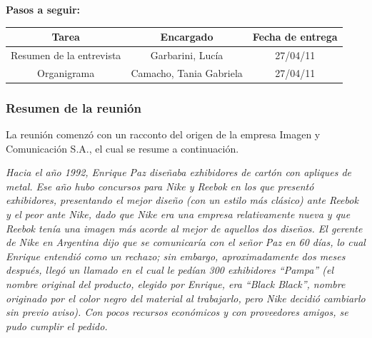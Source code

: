 \documentclass[a4paper,10pt,titlepage]{article}
\begin{document}

%
%

\vspace{8cm}
\textbf{Pasos a seguir:}\\
	    \begin{center}
	    \begin{tabular}{|c|c|c|}
		    \hline \textbf{Tarea} & \textbf{Encargado} & \textbf{Fecha de entrega} \\ 
		    \hline Resumen de la entrevista & Garbarini, Luc\'ia & 27/04/11 \\ 
		    \hline Organigrama & Camacho, Tania Gabriela & 27/04/11 \\ 
		    \hline 
	    \end{tabular}
	    \end{center}

\newpage
\subsubsection*{Resumen de la reuni\'on}
La reunión comenzó con un racconto del origen de la empresa Imagen y Comunicaci\'on S.A., el cual se resume a continuaci\'on.


\textit{Hacia el año 1992, Enrique Paz diseñaba exhibidores de cart\'on con apliques de metal. 
Ese año hubo concursos para Nike y Reebok en los que present\'o exhibidores, presentando el mejor diseño (con un estilo m\'as cl\'asico) ante Reebok y el peor ante Nike, dado que Nike era una empresa relativamente nueva y que Reebok ten\'ia una imagen m\'as acorde al mejor de aquellos dos diseños.
El gerente de Nike en Argentina dijo que se comunicar\'ia con el señor Paz en 60 d\'ias, lo cual Enrique entendi\'o como un rechazo; sin embargo, aproximadamente dos meses despu\'es, lleg\'o un llamado en el cual le ped\'ian 300 exhibidores ``Pampa'' (el nombre original del producto, elegido por Enrique, era ``Black Black'', nombre originado por el color negro del material al trabajarlo, pero Nike decidi\'o cambiarlo sin previo aviso).
Con pocos recursos econ\'omicos y con proveedores amigos, se pudo cumplir el pedido.}
\end{document}
